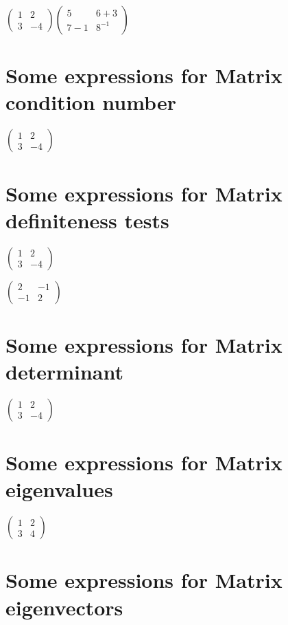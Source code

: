 \documentclass{article}
\begin{document}
$\left( 
\begin{array}{cc}
1 & 2 \\ 
3 & -4%
\end{array}%
\right) \left( 
\begin{array}{cc}
5 & 6+3 \\ 
7-1 & 8^{-1}%
\end{array}%
\right) $

\section{Some expressions for Matrix condition number}

$\left( 
\begin{array}{cc}
1 & 2 \\ 
3 & -4%
\end{array}%
\right) $

\section{Some expressions for Matrix definiteness tests}

$\left( 
\begin{array}{cc}
1 & 2 \\ 
3 & -4%
\end{array}%
\right) $

$\left( 
\begin{array}{cc}
2 & -1 \\ 
-1 & 2%
\end{array}%
\right) $

\section{Some expressions for Matrix determinant}

$\left( 
\begin{array}{cc}
1 & 2 \\ 
3 & -4%
\end{array}%
\right) $

\section{Some expressions for Matrix eigenvalues}

$\left( 
\begin{array}{cc}
1 & 2 \\ 
3 & 4%
\end{array}%
\right) $

\section{Some expressions for Matrix eigenvectors}
\end{document}
